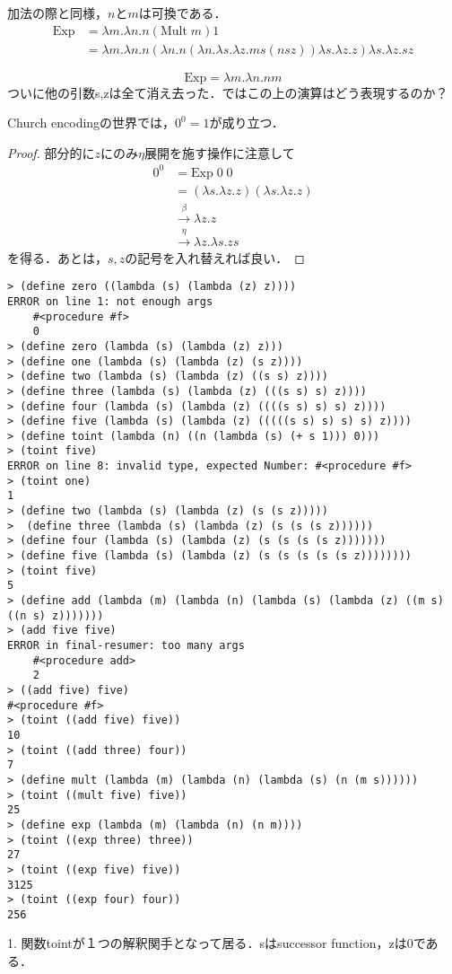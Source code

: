 \documentclass[uplatex, 12pt, dvipdfmx]{jsreport}
\begin{document}
\begin{definition}[冪乗]
    加法の際と同様，$n$と$m$は可換である．
    \begin{align*}
        \mathrm{Exp} &= \lambda m.\lambda n.n(\mathrm{Mult}\; m) 1\\
        &= \lambda m.\lambda n.n(\lambda n.n(\lambda n.\lambda s.\lambda z.ms(nsz)) \lambda s.\lambda z.z) \lambda s.\lambda z.sz
    \end{align*}
\end{definition}
\begin{theorem}\label{prop-lambda-exp}
    \[ \mathrm{Exp} = \lambda m.\lambda n.nm \]
    ついに他の引数s,zは全て消え去った．ではこの上の演算はどう表現するのか？
\end{theorem}
\begin{proposition}
    Church encodingの世界では，$0^0=1$が成り立つ．
\end{proposition}
\begin{proof}
    部分的に$z$にのみ$\eta$展開を施す操作に注意して
    \begin{align*}
        0^0 &= \mathrm{Exp}\;0\;0\\
        &= (\lambda s.\lambda z.z)(\lambda s.\lambda z.z)\\
        &\xrightarrow{\beta} \lambda z.z\\
        &\xrightarrow{\eta} \lambda z.\lambda s.zs
    \end{align*}
    を得る．あとは，$s,z$の記号を入れ替えれば良い．
\end{proof}

\begin{example}[Scheme]

\begin{lstlisting}
> (define zero ((lambda (s) (lambda (z) z))))
ERROR on line 1: not enough args
    #<procedure #f>
    0
> (define zero (lambda (s) (lambda (z) z)))
> (define one (lambda (s) (lambda (z) (s z))))
> (define two (lambda (s) (lambda (z) ((s s) z))))
> (define three (lambda (s) (lambda (z) (((s s) s) z))))
> (define four (lambda (s) (lambda (z) ((((s s) s) s) z))))
> (define five (lambda (s) (lambda (z) (((((s s) s) s) s) z))))
> (define toint (lambda (n) ((n (lambda (s) (+ s 1))) 0)))
> (toint five)
ERROR on line 8: invalid type, expected Number: #<procedure #f>
> (toint one)
1
> (define two (lambda (s) (lambda (z) (s (s z)))))
>  (define three (lambda (s) (lambda (z) (s (s (s z))))))
> (define four (lambda (s) (lambda (z) (s (s (s (s z)))))))
> (define five (lambda (s) (lambda (z) (s (s (s (s (s z))))))))
> (toint five)
5
> (define add (lambda (m) (lambda (n) (lambda (s) (lambda (z) ((m s) ((n s) z)))))))
> (add five five)
ERROR in final-resumer: too many args
    #<procedure add>
    2
> ((add five) five)
#<procedure #f>
> (toint ((add five) five))
10
> (toint ((add three) four))
7
> (define mult (lambda (m) (lambda (n) (lambda (s) (n (m s))))))
> (toint ((mult five) five))
25
> (define exp (lambda (m) (lambda (n) (n m))))
> (toint ((exp three) three))
27
> (toint ((exp five) five))
3125
> (toint ((exp four) four))
256
\end{lstlisting}
    1. 関数tointが１つの解釈関手となって居る．sはsuccessor function，zは0である．
\end{example}
\end{document}
